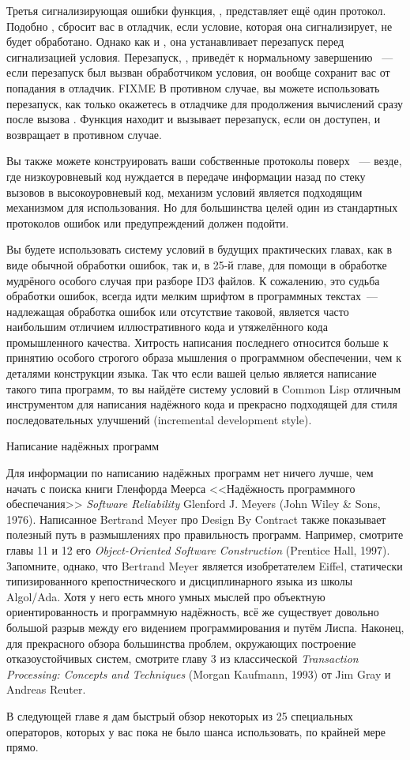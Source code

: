 Третья сигнализирующая ошибки функция, , представляет ещё один протокол.
Подобно ,  сбросит вас в отладчик, если условие, которая она
сигнализирует, не будет обработано. Однако как и , она устанавливает перезапуск
перед сигнализацией условия. Перезапуск, , приведёт к нормальному
завершению ~--- если перезапуск был вызван обработчиком условия, он вообще
сохранит вас от попадания в отладчик. FIXME В противном случае, вы можете использовать
перезапуск, как только окажетесь в отладчике для продолжения вычислений сразу после вызова
. Функция  находит и вызывает  перезапуск, если
он доступен, и возвращает  в противном случае.

Вы также можете конструировать ваши собственные протоколы поверх ~--- везде,
где низкоуровневый код нуждается в передаче информации назад по стеку вызовов в
высокоуровневый код, механизм условий является подходящим механизмом для использования. Но
для большинства целей один из стандартных протоколов ошибок или предупреждений должен
подойти.

Вы будете использовать систему условий в будущих практических главах, как в виде обычной
обработки ошибок, так и, в 25-й главе, для помощи в обработке мудрёного особого случая при
разборе ID3 файлов.  К сожалению, это судьба обработки ошибок, всегда идти мелким шрифтом
в программных текстах~--- надлежащая обработка ошибок или отсутствие таковой, является
часто наибольшим отличием иллюстративного кода и утяжелённого кода промышленного качества.
Хитрость написания последнего относится больше к принятию особого строгого образа мышления
о программном обеспечении, чем к деталями конструкции языка. Так что если вашей целью
является написание такого типа программ, то вы найдёте систему условий в Common Lisp
отличным инструментом для написания надёжного кода и прекрасно подходящей для стиля
последовательных улучшений (incremental development style).


Написание надёжных программ 

Для информации по написанию надёжных программ нет ничего лучше, чем начать с поиска книги
Гленфорда Меерса <<Надёжность программного обеспечания>> \textit{Software Reliability}
Glenford J. Meyers (John Wiley \& Sons, 1976). Написанное Bertrand Meyer про Design By
Contract также показывает полезный путь в размышлениях про правильность
программ. Например, смотрите главы 11 и 12 его \textit{Object-Oriented Software
  Construction} (Prentice Hall, 1997). Запомните, однако, что Bertrand Meyer является
изобретателем Eiffel, статически типизированного крепостнического и дисциплинарного языка
из школы Algol/Ada. Хотя у него есть много умных мыслей про объектную ориентированность и
программную надёжность, всё же существует довольно большой разрыв между его видением
программирования и путём Лиспа. Наконец, для прекрасного обзора большинства проблем,
окружающих построение отказоустойчивых систем, смотрите главу 3 из классической
\textit{Transaction Processing: Concepts and Techniques} (Morgan Kaufmann, 1993) от Jim
Gray и Andreas Reuter.


В следующей главе я дам быстрый обзор некоторых из 25 специальных операторов, которых у
вас пока не было шанса использовать, по крайней мере прямо.

